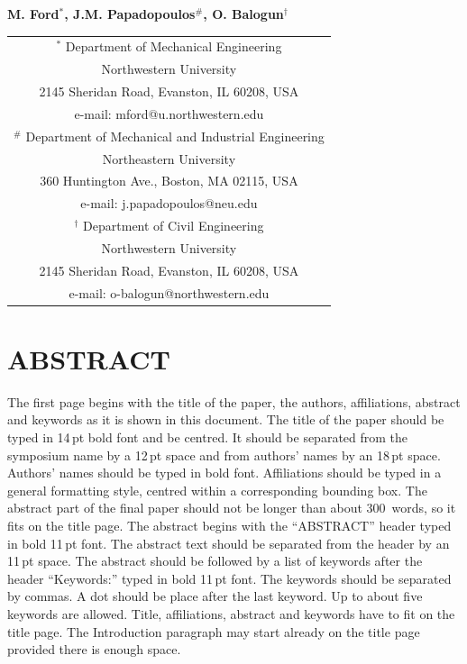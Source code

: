 \documentclass{bmd2016p}
\begin{document}
\begin{center}
\end{center}

\begin{center}
\normalsize{\bf{M. Ford$^{*}$, J.M. Papadopoulos$^\#$, 
            O. Balogun$^\dag$}}
\end{center} 

\begin{center}
\begin{tabular}{c}
$^*$ Department of Mechanical Engineering\\
Northwestern University\\
2145 Sheridan Road, Evanston, IL 60208, USA\\
e-mail: mford@u.northwestern.edu\\[2.5ex]

$^\#$ Department of Mechanical and Industrial Engineering\\
Northeastern University\\
360 Huntington Ave., Boston, MA 02115, USA\\
e-mail: j.papadopoulos@neu.edu\\[2.5ex]

$^\dag$ Department of Civil Engineering\\
Northwestern University\\
2145 Sheridan Road, Evanston, IL 60208, USA\\
e-mail: o-balogun@northwestern.edu\\
\end{tabular}
\end{center}


\section*{ABSTRACT}

The first page begins with the title of the paper, the authors, affiliations, 
abstract and keywords as it is shown in this document. The title of the paper 
should be typed in 14\,pt bold font and be centred. It should be separated 
from the symposium name by a 12\,pt space and from authors' names by an 18\,pt 
space. Authors' names should be typed in bold font. Affiliations should be 
typed in a general formatting style, centred within a corresponding bounding 
box. The abstract part of the final paper should not be longer than about 
300~words, so it fits on the title page. The abstract begins with the 
``ABSTRACT'' header typed in bold 11\,pt font. The abstract text should be 
separated from the header by an 11\,pt space. The abstract should be followed 
by a list of keywords after the header ``Keywords:'' typed in bold 11\,pt 
font. The keywords should be separated by commas. A dot should be place after 
the last keyword. Up to about five keywords are allowed. Title, affiliations, 
abstract and keywords have to fit on the title page. The Introduction 
paragraph may start already on the title page provided there is enough space.
\end{document}
